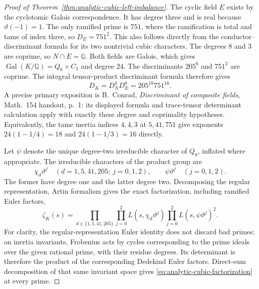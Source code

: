\begin{proof}[Proof of Theorem~\ref{thm:analytic-cubic-left-imbalance}]
The cyclic field $E$ exists by the cyclotomic Galois
correspondence. It has degree three and is real because
$\vartheta(-1)=1$. The only ramified prime is $751$, where the
ramification is total and tame of index three, so
$D_E=751^2$. This also follows directly from the
conductor--discriminant formula for its two nontrivial cubic
characters. The degrees $8$ and $3$ are coprime, so
$N\cap E=\mathbb Q$. Both fields are Galois, which gives
$\operatorname{Gal}(K/\mathbb Q)=Q_8\times C_3$ and degree
$24$. The discriminants $205^6$ and $751^2$ are coprime.
The integral tensor-product discriminant formula therefore
gives
\[
 D_K=D_N^3D_E^8=205^{18}751^{16}.
\]
A precise primary exposition is B.~Conrad,
\emph{Discriminant of composite fields}, Math.~154 handout,
p.~1: its displayed formula and trace-tensor determinant
calculation apply with exactly these degree and coprimality
hypotheses. Equivalently, the tame inertia indices $4,4,3$ at
$5,41,751$ give exponents $24(1-1/4)=18$ and
$24(1-1/3)=16$ directly.

Let $\psi$ denote the unique degree-two irreducible character
of $Q_8$, inflated where appropriate. The irreducible
characters of the product group are
\[
 \chi_d\vartheta^j\quad(d=1,5,41,205;\ j=0,1,2),
 \qquad
 \psi\vartheta^j\quad(j=0,1,2).
\]
The former have degree one and the latter degree two.
Decomposing the regular representation, Artin formalism gives
the exact factorization, including ramified Euler factors,
\begin{equation}\label{eq:analytic-cubic-factorization}
 \zeta_K(s)=
  \prod_{d\in\{1,5,41,205\}}\prod_{j=0}^2
                L(s,\chi_d\vartheta^j)
  \prod_{j=0}^2 L(s,\psi\vartheta^j)^2.
\end{equation}
For clarity, the regular-representation Euler identity does
not discard bad primes: on inertia invariants, Frobenius acts
by cycles corresponding to the prime ideals over the given
rational prime, with their residue degrees. Its determinant
is therefore the product of the corresponding Dedekind Euler
factors. Direct-sum decomposition of that same invariant
space gives \eqref{eq:analytic-cubic-factorization} at every
prime.


\end{proof}
